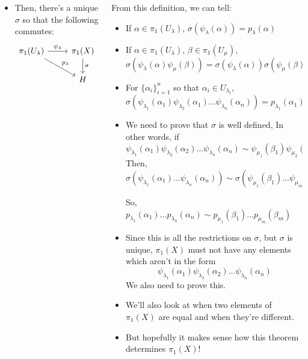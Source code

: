 \documentclass[8pt]{beamer}
\begin{document}
\begin{frame}
\begin{columns}
\begin{column}[T]{0.5\textwidth}
\begin{itemize}
          \item Then, there's a unique $\sigma$ so that the following commutes:
            \[\begin{tikzcd}[ampersand replacement=\&]
                \pi_1(U_\lambda) \ar[rd, "p_\lambda"] \ar[r, "\psi_\lambda"] \&
                \pi_1(X) \ar[d, "\sigma"] \\
                  \& H
              \end{tikzcd}\]
        \end{itemize}
      \end{column}
      \begin{column}[T]{0.5\textwidth}
        From this definition, we can tell:
        \begin{itemize}
          \item If $\alpha \in \pi_1(U_\lambda)$, $\sigma(\psi_\lambda(\alpha)) = p_\lambda(\alpha)$
          \item If $\alpha \in \pi_1(U_\lambda)$, $\beta \in \pi_1(U_\mu)$,
            \[\sigma(\psi_\lambda(\alpha)\psi_\mu(\beta)) =
            \sigma(\psi_\lambda(\alpha))\sigma(\psi_\mu(\beta)) =
            p_\lambda(\alpha)p_\mu(\beta)\]
          \item For $\{\alpha_i\}_{i=1}^n$ so that $\alpha_i \in U_{\lambda_i}$,
            \[\sigma(\psi_{\lambda_1}(\alpha_1)\psi_{\lambda_2}(\alpha_1) ...
            \psi_{\lambda_n}(\alpha_n)) = p_{\lambda_1}(\alpha_1)p_{\lambda_2}(
            \alpha_2) ... p_{\lambda_n}(\alpha_n)\]
          \item We need to prove that $\sigma$ is well defined, In other words,
            if
            \[\psi_{\lambda_1}(\alpha_1) \psi_{\lambda_2}(\alpha_2) ...
              \psi_{\lambda_n}(\alpha_n) \sim \psi_{\mu_1}(\beta_1)
              \psi_{\mu_2}(\alpha_2) ... \psi_{\mu_m}(\mu_m)\]
            Then, $\sigma(\psi_{\lambda_1}(\alpha_1) ...
              \psi_{\lambda_n}(\alpha_n)) \sim \sigma(\psi_{\mu_1}(\beta_1) ...
              \psi_{\mu_m}(\mu_m))$
 
            So, \quad \quad \ \ $p_{\lambda_1}(\alpha_1) ... p_{\lambda_n}(\alpha_n)
              \sim p_{\mu_1}(\beta_1) ... p_{\mu_m}(\beta_m)$
          \item Since this is all the restrictions on $\sigma$, but $\sigma$ is
            unique, $\pi_1(X)$ must not have any elements which aren't in the
            form
              \[\psi_{\lambda_1}(\alpha_1) \psi_{\lambda_2}(\alpha_2) ...
              \psi_{\lambda_n}(\alpha_n)\]
            We also need to prove this.
          \item We'll also look at when two elements of $\pi_1(X)$ are equal and
            when they're different.
          \item But hopefully it makes sense how this theorem determines
            $\pi_1(X)$!
        \end{itemize}
      \end{column}
    \end{columns}
  \end{frame}
\end{document}
